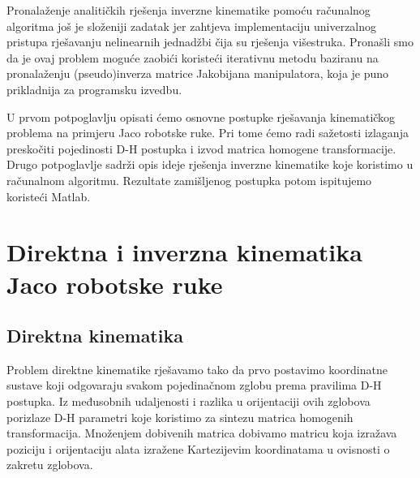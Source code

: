 \documentclass[times, utf8, diplomski, numeric]{fer}
\begin{document}
Pronalaženje analitičkih rješenja inverzne kinematike pomoću računalnog algoritma još je složeniji zadatak jer zahtjeva implementaciju univerzalnog pristupa rješavanju nelinearnih jednadžbi čija su rješenja višestruka.
Pronašli smo da je ovaj problem moguće zaobići koristeći iterativnu metodu baziranu na pronalaženju (pseudo)inverza matrice Jakobijana manipulatora, koja je puno prikladnija za programsku izvedbu.

U prvom potpoglavlju opisati ćemo osnovne postupke rješavanja kinematičkog problema na primjeru Jaco robotske ruke.
Pri tome ćemo radi sažetosti izlaganja preskočiti pojedinosti D-H postupka i izvod matrica homogene transformacije.
Drugo potpoglavlje sadrži opis ideje rješenja inverzne kinematike koje koristimo u računalnom algoritmu.
Rezultate zamišljenog postupka potom ispitujemo koristeći Matlab.

\section{Direktna i inverzna kinematika Jaco robotske ruke}
\subsection{Direktna kinematika}
Problem direktne kinematike rješavamo tako da prvo postavimo koordinatne sustave koji odgovaraju svakom pojedinačnom zglobu prema pravilima D-H postupka.
Iz međusobnih udaljenosti i razlika u orijentaciji ovih zglobova porizlaze D-H parametri koje koristimo za sintezu matrica homogenih transformacija.
Množenjem dobivenih matrica dobivamo matricu koja izražava poziciju i orijentaciju alata izražene Kartezijevim koordinatama u ovisnosti o zakretu zglobova.
 
\end{document}
